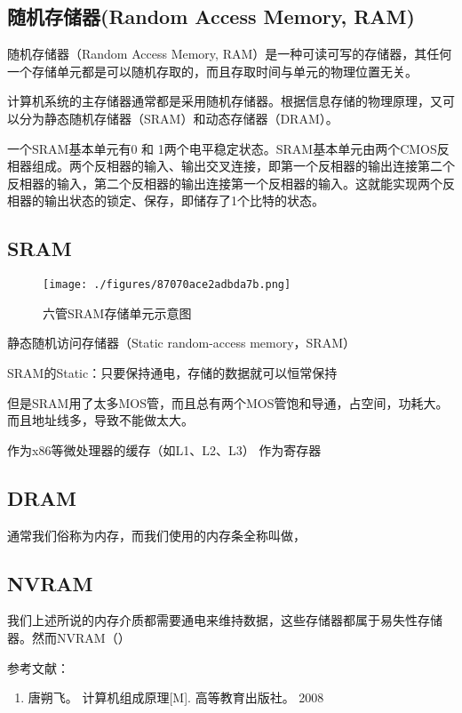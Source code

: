 
\begin{issues}
\issueDraft
\end{issues}

\subsection{随机存储器(Random Access Memory, RAM)}

随机存储器（Random Access Memory, RAM）是一种可读可写的存储器，其任何一个存储单元都是可以随机存取的，而且存取时间与单元的物理位置无关。

计算机系统的主存储器通常都是采用随机存储器。根据信息存储的物理原理，又可以分为静态随机存储器（SRAM）和动态存储器（DRAM）。

一个SRAM基本单元有0 和 1两个电平稳定状态。SRAM基本单元由两个CMOS反相器组成。两个反相器的输入、输出交叉连接，即第一个反相器的输出连接第二个反相器的输入，第二个反相器的输出连接第一个反相器的输入。这就能实现两个反相器的输出状态的锁定、保存，即储存了1个比特的状态。

\subsection{SRAM}

\begin{figure}[ht]
\centering
\texttt{[image: ./figures/87070ace2adbda7b.png]}
\caption{六管SRAM存储单元示意图} \label{fig_RAM_3}
\end{figure}


静态随机访问存储器（Static random-access memory，SRAM）


SRAM的Static：只要保持通电，存储的数据就可以恒常保持

但是SRAM用了太多MOS管，而且总有两个MOS管饱和导通，占空间，功耗大。而且地址线多，导致不能做太大。

作为x86等微处理器的缓存（如L1、L2、L3）
作为寄存器


\subsection{DRAM}

通常我们俗称为内存，而我们使用的内存条全称叫做，


\subsection{NVRAM}

我们上述所说的内存介质都需要通电来维持数据，这些存储器都属于易失性存储器。然而NVRAM（）



参考文献：
\begin{enumerate}
\item 唐朔飞。 计算机组成原理[M]. 高等教育出版社。 2008
\end{enumerate}
